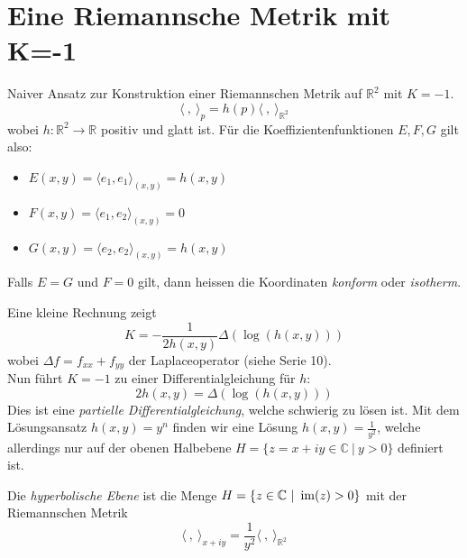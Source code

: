 \documentclass[../main.tex]{subfiles}
\begin{document}
\section{Eine Riemannsche Metrik mit K=-1}
Naiver Ansatz zur Konstruktion einer Riemannschen Metrik auf $\mathbb{R}^2$ mit $K=-1$.
$$\langle \ , \ \rangle _p = h(p) \langle \ , \ \rangle_{\mathbb{R}^2}$$
wobei $h:\mathbb{R}^2 \to \mathbb{R}$ positiv und glatt ist. Für die Koeffizientenfunktionen $E, F, G$ gilt
also: 
\begin{itemize}
    \item $E(x,y) = \langle e_1, e_1 \rangle _{(x,y)} = h(x,y)$
    \item $F(x,y) = \langle e_1, e_2 \rangle _{(x,y)} = 0$
    \item $G(x,y) = \langle e_2, e_2 \rangle _{(x,y)} = h(x,y)$
\end{itemize}
\begin{terminology}
    Falls $E=G$ und $F=0$ gilt, dann heissen die Koordinaten \emph{konform} oder \emph{isotherm}.
\end{terminology}
Eine kleine Rechnung zeigt
$$K = - \frac{1}{2 h(x,y)} \Delta (\log (h(x,y)))$$ wobei $\Delta f = f_{xx} + f_{yy}$ der Laplaceoperator (siehe Serie 10).
\\
Nun führt $K=-1$ zu einer Differentialgleichung für $h$:
$$2 h(x,y)=\Delta (\log (h(x,y)))$$
Dies ist eine \emph{partielle Differentialgleichung}, welche schwierig zu lösen ist. Mit dem Lösungsansatz $h(x,y)=y^n$ finden wir eine Lösung
$h(x,y)=\frac{1}{y^2}$, welche allerdings nur auf der obenen Halbebene
$H= \{ z = x+ iy \in \mathbb{C} \ \vert \ y > 0 \}$ definiert ist.

\begin{definition}
    Die \emph{hyperbolische Ebene} ist die Menge $H= \{ z \in \mathbb{C} \ \vert \ \operatorname{im} (z) > 0 \}$ mit
    der Riemannschen Metrik
    $$\langle \ , \ \rangle _{x+iy} = \frac{1}{y^2} \langle \ , \ \rangle _{\mathbb{R}^2}$$
\end{definition}
\end{document}
